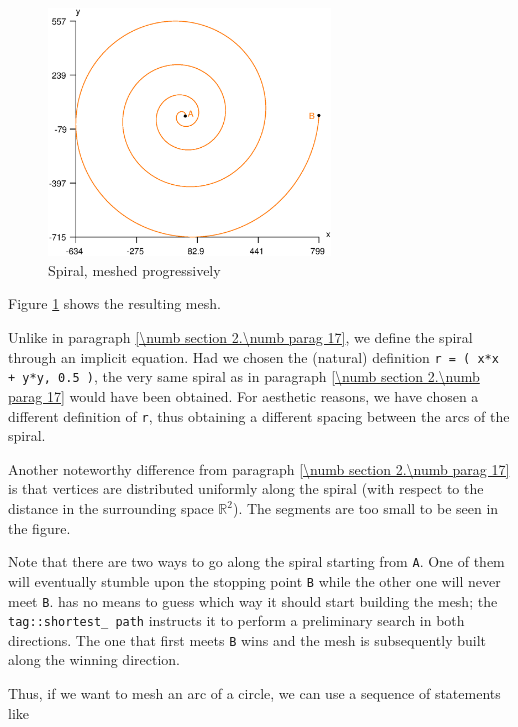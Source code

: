 \begin{figure} \centering
 \includegraphics[width=75mm]{spiral-prog}
  \caption{Spiral, meshed progressively}
 \label{\numb section 3.\numb fig 3}
\end{figure}

Figure \ref{\numb section 3.\numb fig 3} shows the resulting mesh.

Unlike in paragraph \ref{\numb section 2.\numb parag 17}, we define the spiral through
an implicit equation.
Had we chosen the (natural) definition {\small\tt r =  ( x*x + y*y, 0.5 )},
the very same spiral as in paragraph \ref{\numb section 2.\numb parag 17} would have been
obtained.
For aesthetic reasons, we have chosen a different definition of {\small\tt r}, thus obtaining
a different spacing between the arcs of the spiral.

Another noteworthy difference from paragraph \ref{\numb section 2.\numb parag 17} is that
vertices are distributed uniformly along the spiral (with respect to the distance
in the surrounding space $ \mathbb{R}^2 $).
The segments are too small to be seen in the figure.

Note that there are two ways to go along the spiral starting from {\small\tt A}.
One of them will eventually stumble upon the stopping point {\small\tt B} while
the other one will never meet {\small\tt B}.
{\ManiFEM} has no means to guess which way it should start building the mesh;
the {\small\tt\textcolor{tag}{tag}::shortest\_\,path} instructs it
to perform a preliminary search in both directions.
The one that first meets {\small\tt B} wins and the mesh is subsequently built along
the winning direction.

Thus, if we want to mesh an arc of a circle, we can use a sequence of statements like

